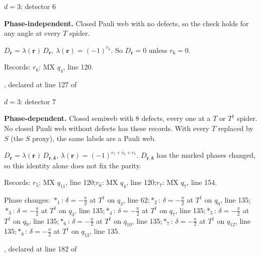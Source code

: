 \label{d3_det006}
{\Large $d=3$: detector 6}\par
\textbf{Phase-independent.} Closed Pauli web with no defects, so the check holds for any angle at every $T$ spider.
\begin{center}
\end{center}
\vspace{-1mm}
$D_{\boldsymbol r}=\lambda(\boldsymbol r)\,D_{\boldsymbol r}$, \quad $\lambda(\boldsymbol r)=(-1)^{r_{6}}$. \qquad So $D_{\boldsymbol r}=0$ unless $r_{6}=0$.
\par\smallskip\begin{minipage}{.98\linewidth}\small Records: $r_{6}$: MX $q_{4}$, line 120.\end{minipage}
\vfill
{\footnotesize\texttt{}, declared at line 127 of \texttt{}}
\newpage

\label{d3_det007}
{\Large $d=3$: detector 7}\par
\textbf{Phase-dependent.} Closed semiweb with 8 defects, every one at a $T$ or $T^\dagger$ spider. No closed Pauli web without defects has these records. With every $T$ replaced by $S$ (the $S$ proxy), the same labels are a Pauli web.
\begin{center}
\end{center}
\vspace{-1mm}
$D_{\boldsymbol r}=\lambda(\boldsymbol r)\,D_{\boldsymbol r,\boldsymbol\delta}$, \quad $\lambda(\boldsymbol r)=(-1)^{r_{5}+r_{6}+r_{7}}$. \qquad $D_{\boldsymbol r,\boldsymbol\delta}$ has the marked phases changed, so this identity alone does not fix the parity.
\par\smallskip\begin{minipage}{.98\linewidth}\small Records: $r_{5}$: MX $q_{11}$, line 120;\quad $r_{6}$: MX $q_{4}$, line 120;\quad $r_{7}$: MX $q_{7}$, line 154.\end{minipage}
\par\smallskip\begin{minipage}{.98\linewidth}\small Phase changes: $\ast_{1}$: $\delta=-\frac{\pi}{2}$ at $T^\dagger$ on $q_{3}$, line 62;\quad $\ast_{2}$: $\delta=-\frac{\pi}{2}$ at $T^\dagger$ on $q_{0}$, line 135;\quad $\ast_{3}$: $\delta=-\frac{\pi}{2}$ at $T^\dagger$ on $q_{3}$, line 135;\quad $\ast_{4}$: $\delta=-\frac{\pi}{2}$ at $T^\dagger$ on $q_{7}$, line 135;\quad $\ast_{5}$: $\delta=-\frac{\pi}{2}$ at $T^\dagger$ on $q_{9}$, line 135;\quad $\ast_{6}$: $\delta=-\frac{\pi}{2}$ at $T^\dagger$ on $q_{10}$, line 135;\quad $\ast_{7}$: $\delta=-\frac{\pi}{2}$ at $T^\dagger$ on $q_{12}$, line 135;\quad $\ast_{8}$: $\delta=-\frac{\pi}{2}$ at $T^\dagger$ on $q_{13}$, line 135.\end{minipage}
\vfill
{\footnotesize\texttt{}, declared at line 182 of \texttt{}}
\newpage

